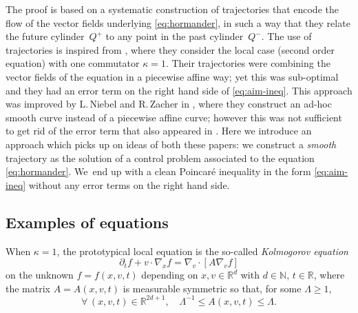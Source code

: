 \documentclass[10pt,a4paper]{amsart}
\theoremstyle{definition}
\newcommand\N{{\mathbb N}}
\newcommand\R{{\mathbb R}}
\begin{document}
The proof is based on a systematic construction of trajectories that encode the flow of the vector fields underlying \eqref{eq:hormander}, in such a way that they relate the future cylinder~$Q^+$ to any point in the past cylinder~$Q^-$.
The use of trajectories is inspired from \cite{guerand-mouhot}, where they consider the local case (second order equation) with one commutator $\kappa = 1$. Their trajectories were combining the vector fields of the equation in a piecewise affine way; yet this was sub-optimal and they had an error term on the right hand side of \eqref{eq:aim-ineq}. This approach was improved by L.\,Niebel and R.\,Zacher in \cite{niebel2022kinetic}, where they construct an ad-hoc smooth curve instead of a piecewise affine curve; however this was not sufficient to get rid of the error term that also appeared in \cite{guerand-mouhot}. Here we introduce an approach which picks up on ideas of both these papers: we construct a \textit{smooth} trajectory as the solution of a control problem associated to the equation \eqref{eq:hormander}. We~end up with a clean Poincaré inequality in the form \eqref{eq:aim-ineq} without any error terms on the right hand side.

\subsection{Examples of equations}

When $\kappa=1$, the prototypical local equation is the so-called
\emph{Kolmogorov equation}
\begin{equation}
\label{eq:kolmo}
\partial_t f + v \cdot \nabla_x f = \nabla_v \cdot \left[ A
\nabla_v f \right]
\end{equation}
on the unknown $f=f(x,v,t)$ depending on $x,v \in \R^d$ with
$d \in \N$, $t \in \R$, where the matrix $A=A(x,v,t)$ is
measurable symmetric so that, for some $\Lambda \ge 1$,
\begin{equation}
\label{eq:ellip-1}
\forall \, (x,v,t) \in \R^{2d+1}, \quad \Lambda^{-1} \le
A(x,v,t) \le \Lambda.
\end{equation}
\end{document}
